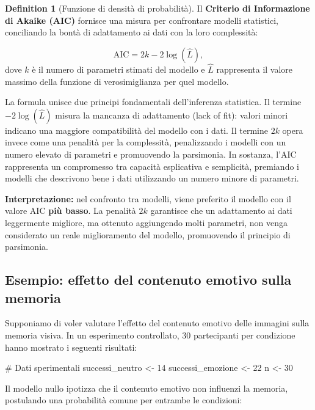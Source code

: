 \documentclass[
  letterpaper,
  DIV=11,
  numbers=noendperiod,
  oneside]{scrreprt}
\newenvironment{Shaded}{\begin{snugshade}}{\end{snugshade}}
\newcommand{\CommentTok}[1]{\textcolor[rgb]{0.37,0.37,0.37}{#1}}
\newcommand{\DecValTok}[1]{\textcolor[rgb]{0.68,0.00,0.00}{#1}}
\newcommand{\NormalTok}[1]{\textcolor[rgb]{0.00,0.23,0.31}{#1}}
\newcommand{\OtherTok}[1]{\textcolor[rgb]{0.00,0.23,0.31}{#1}}
\theoremstyle{definition}
\theoremstyle{plain}
\theoremstyle{definition}
\newtheorem{definition}{Definition}[chapter]
\theoremstyle{remark}
\begin{document}
\begin{definition}[Funzione di densità di
probabilità]
Il \textbf{Criterio di Informazione di Akaike (AIC)} fornisce una misura
per confrontare modelli statistici, conciliando la bontà di adattamento
ai dati con la loro complessità:

\[
\text{AIC} = 2k - 2\log(\hat{L}),
\] dove \(k\) è il numero di parametri stimati del modello e \(\hat{L}\)
rappresenta il valore massimo della funzione di verosimiglianza per quel
modello.

La formula unisce due principi fondamentali dell'inferenza statistica.
Il termine \(-2\log(\hat{L})\) misura la mancanza di adattamento (lack
of fit): valori minori indicano una maggiore compatibilità del modello
con i dati. Il termine \(2k\) opera invece come una penalità per la
complessità, penalizzando i modelli con un numero elevato di parametri e
promuovendo la parsimonia. In sostanza, l'AIC rappresenta un compromesso
tra capacità esplicativa e semplicità, premiando i modelli che
descrivono bene i dati utilizzando un numero minore di parametri.

\textbf{Interpretazione:} nel confronto tra modelli, viene preferito il
modello con il valore AIC \textbf{più basso}. La penalità \(2k\)
garantisce che un adattamento ai dati leggermente migliore, ma ottenuto
aggiungendo molti parametri, non venga considerato un reale
miglioramento del modello, promuovendo il principio di parsimonia.

\subsection{Esempio: effetto del contenuto emotivo sulla
memoria}\label{esempio-effetto-del-contenuto-emotivo-sulla-memoria}

Supponiamo di voler valutare l'effetto del contenuto emotivo delle
immagini sulla memoria visiva. In un esperimento controllato, 30
partecipanti per condizione hanno mostrato i seguenti risultati:

\begin{Shaded}
\begin{Highlighting}[]
\CommentTok{\# Dati sperimentali}
\NormalTok{successi\_neutro }\OtherTok{\textless{}{-}} \DecValTok{14}
\NormalTok{successi\_emozione }\OtherTok{\textless{}{-}} \DecValTok{22}
\NormalTok{n }\OtherTok{\textless{}{-}} \DecValTok{30}
\end{Highlighting}
\end{Shaded}

Il modello nullo ipotizza che il contenuto emotivo non influenzi la
memoria, postulando una probabilità comune per entrambe le condizioni:


\end{definition}
\end{document}
